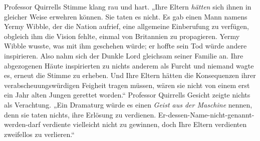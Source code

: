 Professor Quirrells Stimme klang rau und hart. „Ihre Eltern \emph{hätten} sich ihnen in gleicher Weise erwehren können. Sie taten es nicht. Es gab einen Mann namens Yermy Wibble, der die Nation aufrief, eine allgemeine Einberufung zu verfügen, obgleich ihm die Vision fehlte, einmal von Britannien zu propagieren. Yermy Wibble wusste, was mit ihm geschehen würde; er hoffte sein Tod würde andere inspirieren. Also nahm sich der Dunkle Lord gleichsam seiner Familie an. Ihre abgezogenen Häute inspirierten zu nichts anderem als Furcht und niemand wagte es, erneut die Stimme zu erheben. Und Ihre Eltern hätten die Konsequenzen ihrer verabscheuungswürdigen Feigheit tragen müssen, wären sie nicht von einem erst ein Jahr alten Jungen gerettet worden.“ Professor Quirrells Gesicht zeigte nichts als Verachtung. „Ein Dramaturg würde es einen \emph{Geist aus der Maschine} nennen, denn sie taten nichts, ihre Erlösung zu verdienen. Er-dessen-Name-nicht-genannt-werden-darf verdiente vielleicht nicht zu gewinnen, doch Ihre Eltern verdienten zweifellos zu verlieren.“

